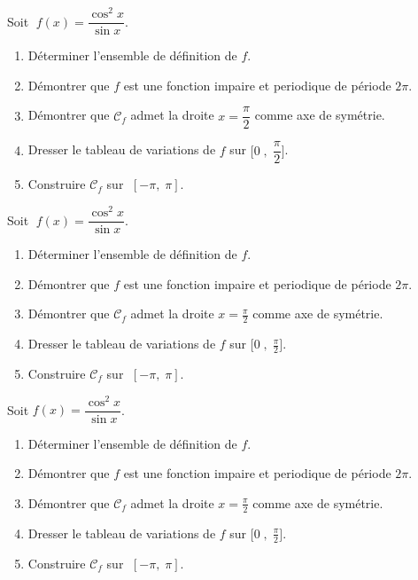  \begin{exercice}

Soit  $ \;f(x)=\dfrac{\cos^2 x}{\sin x} $.
 \begin{enumerate}
 \item Déterminer  l'ensemble de définition de $ f $.
 \item Démontrer que $ f $ est une fonction impaire et periodique de période $ 2\pi $.
 \item Démontrer  que  $ \mathcal{C}_{f} $  admet la droite $ x=\dfrac{\pi}{2} $ comme axe  de symétrie.
 \item Dresser  le tableau de variations  de $ f$ sur $\bigl[0\; ,\;\dfrac{\pi}{2}\bigr] $.
 \item Construire $ \mathcal{C}_{f} $  sur  $ \;[-\pi,\; \pi] $.
 \end{enumerate}
    
\end{exercice}

 

Soit  $\; f(x)=\dfrac{\cos^2 x}{\sin x} $.
 \begin{enumerate}
 \item Déterminer  l'ensemble de définition de $ f $.
 \item Démontrer que $ f $ est une fonction impaire et periodique de période $ 2\pi $.
 \item Démontrer  que  $ \mathcal{C}_{f} $  admet la droite $ x=\tfrac{\pi}{2} $ comme axe  de symétrie.
 \item Dresser  le tableau de variations  de $ f$ sur $\bigl[0\; ,\;\frac{\pi}{2}\bigr] $.
 \item Construire $ \mathcal{C}_{f} $  sur \; $ \; [-\pi,\; \pi] $.
 \end{enumerate}
 Soit \; $ f(x)=\dfrac{\cos^2 x}{\sin x} $.
 \begin{enumerate}
 \item Déterminer  l'ensemble de définition de $ f $.
 \item Démontrer que $ f $ est une fonction impaire et periodique de période $ 2\pi $.
 \item Démontrer  que  $ \mathcal{C}_{f} $  admet la droite $ x=\frac{\pi}{2} $ comme axe  de symétrie.
 \item Dresser  le tableau de variations  de $ f$ sur $\bigl[0\; ,\;\frac{\pi}{2}\bigr] $.
 \item Construire $ \mathcal{C}_{f} $  sur $  \;[-\pi,\; \pi] $.
 \end{enumerate}


